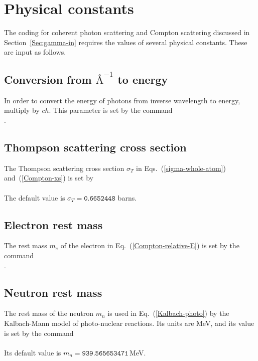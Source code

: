 \section{Physical constants}
The coding for coherent photon scattering and Compton scattering
discussed in Section~\ref{Sec:gamma-in} requires the values of several physical
constants.  These are input as follows.

\subsection{Conversion from $\text{\AA}^{-1}$ to energy}\label{Sec:cm-to-Mev}
In order to convert the energy of photons from inverse wavelength
to energy, multiply by $ch$.  This parameter is set by
the command\\
  .

\subsection{Thompson scattering cross section}\label{Sec:Thompson-xs}
The Thompson scattering cross section $\sigma_T$ in 
Eqs.~(\ref{sigma-whole-atom}) and~(\ref{Compton-xs}) is
set by\\
  \\
The default value is $\sigma_T = \texttt{0.6652448}$ barns.

\subsection{Electron rest mass}\label{Sec:electron-mass}
The rest mass $m_e$ of the electron in Eq.~(\ref{Compton-relative-E}) is
set by the command\\
  .

\subsection{Neutron rest mass}\label{Sec:neutron-mass}
The rest mass of the neutron $m_n$ is used in Eq.~(\ref{Kalbach-photo})
by the Kalbach-Mann model of photo-nuclear reactions.
Its units are MeV, and its value is set by the command\\
  \\
Its default value is $m_n = \texttt{939.565653471}\,$MeV.

